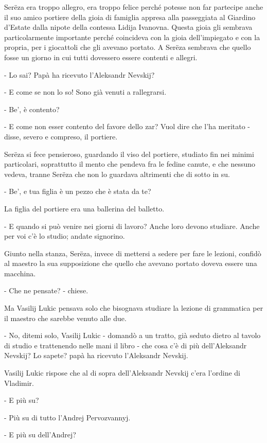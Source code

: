 Serëza era troppo allegro, era troppo felice perché potesse non far partecipe anche il suo amico portiere della gioia di famiglia appresa alla passeggiata al Giardino d'Estate dalla nipote della contessa Lidija Ivanovna. Questa gioia gli sembrava particolarmente importante perché coincideva con la gioia dell'impiegato e con la propria, per i giocattoli che gli avevano portato. A Serëza sembrava che quello fosse un giorno in cui tutti dovessero essere contenti e allegri. 

- Lo sai? Papà ha ricevuto l'Aleksandr Nevskij? 

- E come se non lo so! Sono già venuti a rallegrarsi. 

- Be', è contento? 

- E come non esser contento del favore dello zar? Vuol dire che l'ha meritato - disse, severo e compreso, il portiere. 

Serëza si fece pensieroso, guardando il viso del portiere, studiato fin nei minimi particolari, soprattutto il mento che pendeva fra le fedine canute, e che nessuno vedeva, tranne Serëza che non lo guardava altrimenti che di sotto in su. 

- Be', e tua figlia è un pezzo che è stata da te? 

La figlia del portiere era una ballerina del balletto. 

- E quando si può venire nei giorni di lavoro? Anche loro devono studiare. Anche per voi c'è lo studio; andate signorino. 

Giunto nella stanza, Serëza, invece di mettersi a sedere per fare le lezioni, confidò al maestro la sua supposizione che quello che avevano portato doveva essere una macchina. 

- Che ne pensate? - chiese. 

Ma Vasilij Lukic pensava solo che bisognava studiare la lezione di grammatica per il maestro che sarebbe venuto alle due. 

- No, ditemi solo, Vasilij Lukic - domandò a un tratto, già seduto dietro al tavolo di studio e trattenendo nelle mani il libro - che cosa c'è di più dell'Aleksandr Nevskij? Lo sapete? papà ha ricevuto l'Aleksandr Nevskij. 

Vasilij Lukic rispose che al di sopra dell'Aleksandr Nevskij c'era l'ordine di Vladimir. 

- E più su? 

- Più su di tutto l'Andrej Pervozvannyj. 

- E più su dell'Andrej? 

